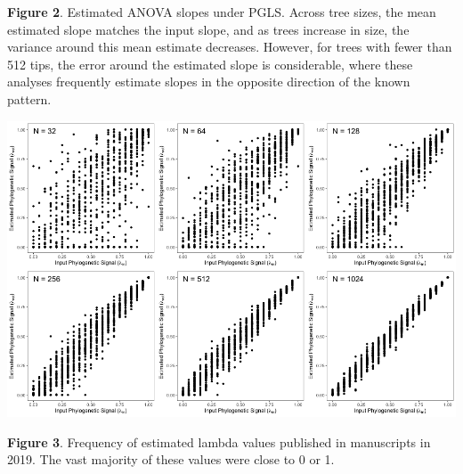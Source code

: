 \documentclass[]{article}
\begin{document}
\singlespacing \textbf{Figure 2}. Estimated ANOVA slopes under PGLS.
Across tree sizes, the mean estimated slope matches the input slope, and
as trees increase in size, the variance around this mean estimate
decreases. However, for trees with fewer than 512 tips, the error around
the estimated slope is considerable, where these analyses frequently
estimate slopes in the opposite direction of the known pattern.
\hfill\break

\newpage

\includegraphics[width=0.95\linewidth]{Fig3}

\singlespacing \textbf{Figure 3}. Frequency of estimated lambda values
published in manuscripts in 2019. The vast majority of these values were
close to 0 or 1.
\end{document}
